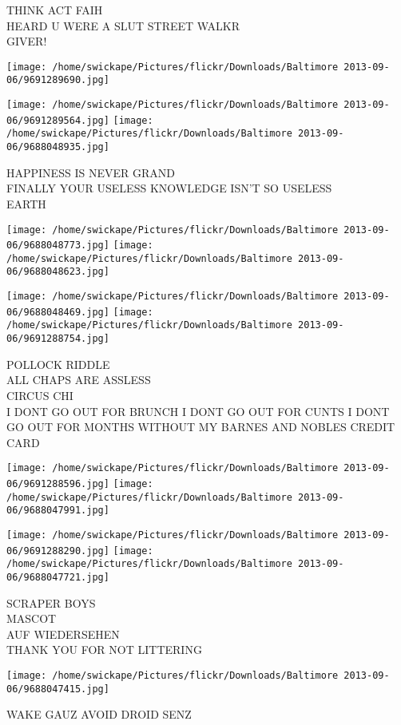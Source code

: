 \documentclass[10pt,letterpaper]{article}
\begin{document}
THINK ACT FAIH\\
HEARD U WERE A SLUT STREET WALKR\\
GIVER!\\
\pagebreak

\texttt{[image: /home/swickape/Pictures/flickr/Downloads/Baltimore 2013-09-06/9691289690.jpg]}

\vspace{0.25in}
\texttt{[image: /home/swickape/Pictures/flickr/Downloads/Baltimore 2013-09-06/9691289564.jpg]}
\texttt{[image: /home/swickape/Pictures/flickr/Downloads/Baltimore 2013-09-06/9688048935.jpg]}

HAPPINESS IS NEVER GRAND\\
FINALLY YOUR USELESS KNOWLEDGE ISN'T SO USELESS\\
EARTH\\
\pagebreak

\texttt{[image: /home/swickape/Pictures/flickr/Downloads/Baltimore 2013-09-06/9688048773.jpg]}
\texttt{[image: /home/swickape/Pictures/flickr/Downloads/Baltimore 2013-09-06/9688048623.jpg]}

\texttt{[image: /home/swickape/Pictures/flickr/Downloads/Baltimore 2013-09-06/9688048469.jpg]}
\texttt{[image: /home/swickape/Pictures/flickr/Downloads/Baltimore 2013-09-06/9691288754.jpg]}

POLLOCK RIDDLE\\
ALL CHAPS ARE ASSLESS\\
CIRCUS CHI\\
I DONT GO OUT FOR BRUNCH I DONT GO OUT FOR CUNTS I DONT GO OUT FOR MONTHS WITHOUT MY BARNES AND NOBLES CREDIT CARD\\
\pagebreak

\texttt{[image: /home/swickape/Pictures/flickr/Downloads/Baltimore 2013-09-06/9691288596.jpg]}
\texttt{[image: /home/swickape/Pictures/flickr/Downloads/Baltimore 2013-09-06/9688047991.jpg]}

\texttt{[image: /home/swickape/Pictures/flickr/Downloads/Baltimore 2013-09-06/9691288290.jpg]}
\texttt{[image: /home/swickape/Pictures/flickr/Downloads/Baltimore 2013-09-06/9688047721.jpg]}

SCRAPER BOYS\\
MASCOT\\
AUF WIEDERSEHEN\\
THANK YOU FOR NOT LITTERING\\
\pagebreak

\texttt{[image: /home/swickape/Pictures/flickr/Downloads/Baltimore 2013-09-06/9688047415.jpg]}

WAKE GAUZ AVOID DROID SENZ\\
\pagebreak
\end{document}
